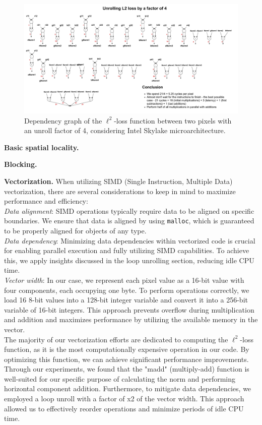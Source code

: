 \documentclass[letterpaper]{article}
\newcommand{\mypar}[1]{{\bf #1.}}
\begin{document}
\begin{figure}[htbp]
\centering
  \includegraphics[scale=0.18]{Unrolling.pdf}
  \caption{Dependency graph of the $\ell^2$-loss function between two pixels with an unroll factor of 4, considering Intel Skylake microarchitecture.\label{unroll}}
\end{figure}
\mypar{Basic spatial locality} 

\mypar{Blocking} 

\mypar{Vectorization} When utilizing SIMD (Single Instruction, Multiple Data) vectorization, there are several considerations to keep in mind to maximize performance and efficiency: \\ 
\textit{Data alignment}: SIMD operations typically require data to be aligned on specific boundaries. We ensure that data is aligned by using \texttt{malloc}, which is guaranteed to be properly aligned for objects of any type. \\
\textit{Data dependency}: Minimizing data dependencies within vectorized code is crucial for enabling parallel execution and fully utilizing SIMD capabilities. To achieve this, we apply insights discussed in the loop unrolling section, reducing idle CPU time. \\
\textit{Vector width}: In our case, we represent each pixel value as a 16-bit value with four components, each occupying one byte. To perform operations correctly, we load 16 8-bit values into a 128-bit integer variable and convert it into a 256-bit variable of 16-bit integers. This approach prevents overflow during multiplication and addition and maximizes performance by utilizing the available memory in the vector.\\
The majority of our vectorization efforts are dedicated to computing the $\ell^2$-loss function, as it is the most computationally expensive operation in our code. By optimizing this function, we can achieve significant performance improvements. \\
Through our experiments, we found that the "madd" (multiply-add) function is well-suited for our specific purpose of calculating the norm and performing horizontal component addition.
Furthermore, to mitigate data dependencies, we employed a loop unroll with a factor of x2 of the vector width. This approach allowed us to effectively reorder operations and minimize periods of idle CPU time. 
\end{document}
